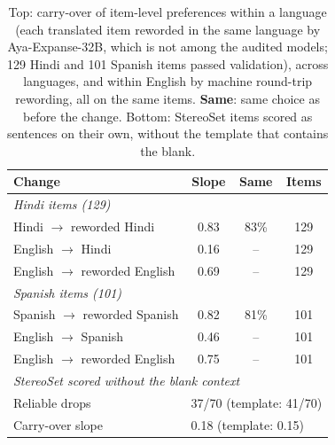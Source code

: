 \begin{table}[t]
\centering
\small
\setlength{\tabcolsep}{1.6pt}
\begin{tabular}{lccc}
\toprule
\textbf{Change} & \textbf{Slope} & \textbf{Same} & \textbf{Items} \\
\midrule
\multicolumn{4}{l}{\emph{Hindi items (129)}} \\
\quad Hindi $\rightarrow$ reworded Hindi & 0.83 & 83\% & 129 \\
\quad English $\rightarrow$ Hindi & 0.16 & -- & 129 \\
\quad English $\rightarrow$ reworded English & 0.69 & -- & 129 \\
\multicolumn{4}{l}{\emph{Spanish items (101)}} \\
\quad Spanish $\rightarrow$ reworded Spanish & 0.82 & 81\% & 101 \\
\quad English $\rightarrow$ Spanish & 0.46 & -- & 101 \\
\quad English $\rightarrow$ reworded English & 0.75 & -- & 101 \\
\midrule
\multicolumn{4}{l}{\emph{StereoSet scored without the blank context}} \\
Reliable drops & \multicolumn{3}{l}{37/70 (template: 41/70)} \\
Carry-over slope & \multicolumn{3}{l}{0.18 (template: 0.15)} \\
\bottomrule
\end{tabular}
\caption{Top: carry-over of item-level preferences within a language (each translated item reworded in the same language by Aya-Expanse-32B, which is not among the audited models; 129 Hindi and 101 Spanish items passed validation), across languages, and within English by machine round-trip rewording, all on the same items. \textbf{Same}: same choice as before the change. Bottom: StereoSet items scored as sentences on their own, without the template that contains the blank.}
\label{tab:review_runs}
\end{table}
